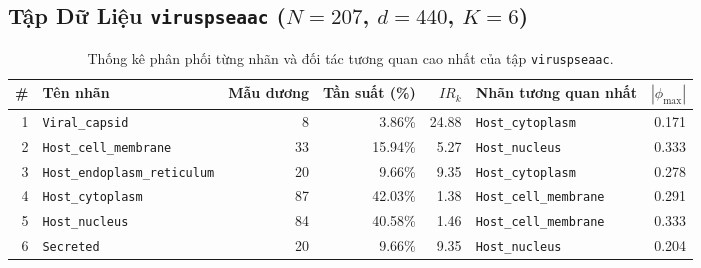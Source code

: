 \documentclass[11pt,a4paper]{article}
\begin{document}
\subsection{Tập Dữ Liệu \texttt{viruspseaac} ($N=207$, $d=440$, $K=6$)}
\begin{table}[htbp]
\centering
\footnotesize
\caption{Thống kê phân phối từng nhãn và đối tác tương quan cao nhất của tập \texttt{viruspseaac}.}
\begin{tabularx}{0.95\textwidth}{r l r r r l r}
\toprule
\textbf{\#} & \textbf{Tên nhãn} & \textbf{Mẫu dương} & \textbf{Tần suất (\%)} & \textbf{$IR_k$} & \textbf{Nhãn tương quan nhất} & \textbf{$|\phi_{\max}|$} \\
\midrule
1 & \texttt{Viral\_capsid} & 8 & 3.86\% & 24.88 & \texttt{Host\_cytoplasm} & 0.171 \\
2 & \texttt{Host\_cell\_membrane} & 33 & 15.94\% & 5.27 & \texttt{Host\_nucleus} & 0.333 \\
3 & \texttt{Host\_endoplasm\_reticulum} & 20 & 9.66\% & 9.35 & \texttt{Host\_cytoplasm} & 0.278 \\
4 & \texttt{Host\_cytoplasm} & 87 & 42.03\% & 1.38 & \texttt{Host\_cell\_membrane} & 0.291 \\
5 & \texttt{Host\_nucleus} & 84 & 40.58\% & 1.46 & \texttt{Host\_cell\_membrane} & 0.333 \\
6 & \texttt{Secreted} & 20 & 9.66\% & 9.35 & \texttt{Host\_nucleus} & 0.204 \\
\bottomrule
\end{tabularx}
\end{table}
\end{document}
